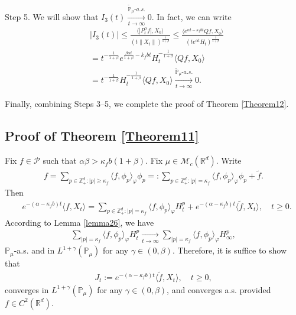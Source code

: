 \documentclass[12pt]{amsart}
\theoremstyle{plain}
\theoremstyle{definition}
\numberwithin{equation}{section}
\begin{document}
	Step 5. We will show that $I_3(t) \xrightarrow[t\to \infty]{\tilde {\mathbb P}_\mu \text{-} a.s.} 0$. 
	In fact, we can write
\begin{align}
	&|I_3(t)| 
	\leq \frac{\langle |P^\alpha_tf|,X_0\rangle}{(t\|X_t\|)^{\frac{1}{1+\beta}}}
	\leq \frac{\langle e^{\alpha t - \kappa_f b t}Qf,X_0\rangle}{(te^{\alpha t} H_t)^{\frac{1}{1+\beta}}}
	\\& = t^{-\frac{1}{1+\beta}} e^{\frac{\beta \alpha t}{1+\beta} - k_fbt} H_t^{-\frac{1}{1+\beta}} \langle Qf,X_0\rangle
	\\& = t^{-\frac{1}{1+\beta}} H_t^{-\frac{1}{1+\beta}} \langle Qf,X_0\rangle
	\xrightarrow[t\to \infty]{\tilde {\mathbb P}_\mu \text{-} a.s.} 0.
\end{align}

	Finally, combining Steps 3--5, we complete the proof of Theorem \ref{Theorem12}.

\subsection{Proof of Theorem \ref{Theorem11}}
	Fix  $f \in \mathcal P$ such that $\alpha \beta > \kappa_f b (1+\beta)$.
	Fix $\mu \in \mathcal M_c(\mathbb R^d)$.
	Write
\begin{align}
    f
    =\sum_{p\in \mathbb Z_+^d:|p|\geq \kappa_f}\langle f,\phi_p\rangle_\varphi \phi_p
    =:
    \sum_{p\in \mathbb Z_+^d:|p|= \kappa_f}\langle f,\phi_p\rangle_\varphi \phi_p+\tilde{f}.
\end{align}
	Then
\begin{align*}
    &e^{-(\alpha-\kappa_fb)t}\langle f,X_t\rangle=
    \sum_{p\in \mathbb Z_+^d:|p|= \kappa_f}\langle f,\phi_p\rangle_\varphi H_t^p+e^{-(\alpha-\kappa_fb)t} \langle \tilde{f},X_t\rangle,
    \quad t\geq 0.
\end{align*}
	According to Lemma \ref{lemma26}, 
	we have
\begin{align}
\label{as convergence}
     \sum_{|p|= \kappa_f}\langle f,\phi_p\rangle_\varphi H_t^p
     \xrightarrow[t\to \infty]{} \sum_{|p|=\kappa_f}\langle f, \phi_p\rangle_{\varphi} H_{\infty}^p,
\end{align}
$\mathbb{P}_{\mu}$-a.s. and in $L^{1+\gamma}(\mathbb{P}_{\mu})$ for any $\gamma\in(0,\beta)$.
	Therefore, it is suffice to show that
\begin{align}
    J_t
    :=e^{-(\alpha-\kappa_fb)t}\langle \tilde{f},X_t\rangle,
    \quad t\geq 0,
\end{align}
	converges in $L^{1+\gamma}(\mathbb{P}_{\mu})$ for any $\gamma\in(0,\beta)$, and converges a.s. provided $f\in C^2(\mathbb R^d)$.
\end{document}
